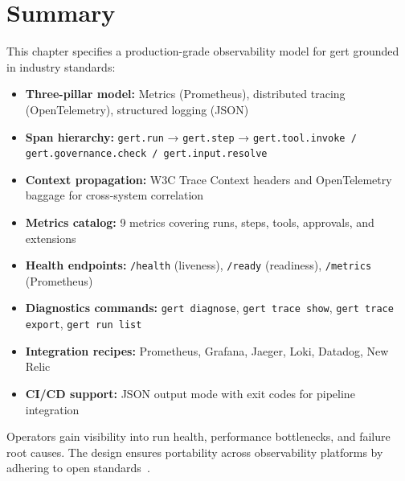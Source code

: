 \section{Summary}

This chapter specifies a production-grade observability model for gert grounded in industry standards:

\begin{itemize}
  \item \textbf{Three-pillar model:} Metrics (Prometheus), distributed tracing (OpenTelemetry), structured logging (JSON)
  \item \textbf{Span hierarchy:} \texttt{gert.run} → \texttt{gert.step} → \texttt{gert.tool.invoke / gert.governance.check / gert.input.resolve}
  \item \textbf{Context propagation:} W3C Trace Context headers and OpenTelemetry baggage for cross-system correlation
  \item \textbf{Metrics catalog:} 9 metrics covering runs, steps, tools, approvals, and extensions
  \item \textbf{Health endpoints:} \texttt{/health} (liveness), \texttt{/ready} (readiness), \texttt{/metrics} (Prometheus)
  \item \textbf{Diagnostics commands:} \texttt{gert diagnose}, \texttt{gert trace show}, \texttt{gert trace export}, \texttt{gert run list}
  \item \textbf{Integration recipes:} Prometheus, Grafana, Jaeger, Loki, Datadog, New Relic
  \item \textbf{CI/CD support:} JSON output mode with exit codes for pipeline integration
\end{itemize}

Operators gain visibility into run health, performance bottlenecks, and failure root causes. The design ensures portability across observability platforms by adhering to open standards~\cite{otel-spec, w3c-trace-context, google-sre-book}.
